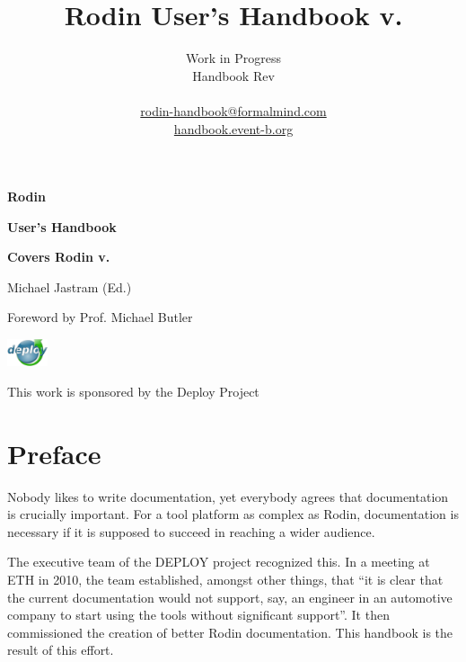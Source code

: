 \documentclass[12pt]{book}
\title{Rodin User's Handbook v.\versionnr}
\author{
Work in Progress\\
Handbook $ $Rev$ $ \\
\\
\href{mailto:rodin-handbook@formalmind.com}{rodin-handbook@formalmind.com}\\
\href{http://handbook.event-b.org}{handbook.event-b.org}
}
\begin{document}
        

\ifplastex
\maketitle
\else
\begin{titlepage}
\AddToShipoutPicture*{\BackgroundPic}
\vspace*{14.5cm}
{\fontsize{70}{85}\selectfont \bfseries Rodin}

\vspace*{0.2cm}
{\fontsize{24.5}{30}\selectfont \bfseries User's Handbook}

\vspace*{1cm}
{\fontsize{16}{19}\selectfont \textbf{\textsf{Covers Rodin v.\versionnr}}}

\vspace*{1cm}
{\fontsize{16}{19}\selectfont \textsf{Michael Jastram (Ed.)}}

\vspace*{0.2cm}
{\fontsize{16}{19}\selectfont \textsf{Foreword by Prof. Michael Butler}}

\vspace*{1cm}
\includegraphics[width=12mm]{img/deploy-logo.png}

\vspace*{-8.4mm}
\hspace*{12mm}
{ \fontsize{11}{15}\selectfont \textsf{This work is sponsored by the Deploy Project}}

\vspace*{-22mm}

\end{titlepage}
{}
\tableofcontents
\fi

\chapter*{Preface}
\label{preface}

Nobody likes to write documentation, yet everybody agrees that documentation is crucially important.  For a tool platform as complex as Rodin, documentation is necessary if it is supposed to succeed in reaching a wider audience.

The executive team of the DEPLOY project recognized this. In a meeting at ETH in 2010, the team established, amongst other things, that ``it is clear that the current documentation would not support, say, an engineer in an automotive company to start using the tools without significant support''.  It then commissioned the creation of better Rodin documentation.  This handbook is the result of this effort.
\end{document}
